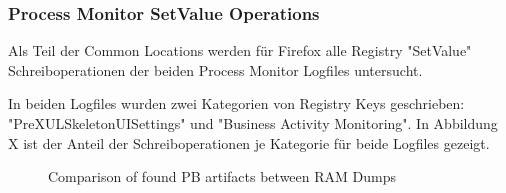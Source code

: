 \begin{appendices}
\subsubsection*{Process Monitor SetValue Operations}

Als Teil der Common Locations werden für Firefox alle Registry "SetValue" Schreiboperationen der beiden Process Monitor Logfiles untersucht.

In beiden Logfiles wurden zwei Kategorien von Registry Keys geschrieben: "PreXULSkeletonUISettings" und "Business Activity Monitoring". In Abbildung X ist der Anteil der Schreiboperationen je Kategorie für beide Logfiles gezeigt.
\begin{figure}[h!]
	\centerline{}
	\label{chart:final-criteria}  
	\caption{Comparison of found PB artifacts between RAM Dumps}
\end{figure}


\end{appendices}
